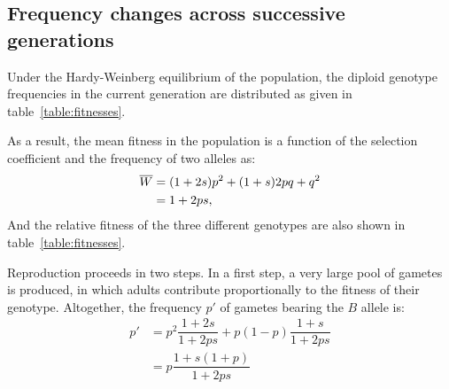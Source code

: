 \subsection{Frequency changes across successive generations}

Under the Hardy-Weinberg equilibrium of the population, the diploid genotype frequencies in the current generation are distributed as given in table~\ref{table:fitnesses}.

As a result, the mean fitness in the population is a function of the selection coefficient and the frequency of two alleles as:
\begin{align}
    \overline{W} &= (1+2s)p^2 + (1+s)2pq + q^2 \\
    &= 1 + 2ps,
\end{align}
And the relative fitness of the three different genotypes are also shown in table~\ref{table:fitnesses}.

\begin{table}[H]
    \centering
    \noindent{}
    \caption[Fitnesses of the different genotypes]{Fitnesses of the different genotypes}\label{table:fitnesses}
\end{table}

Reproduction proceeds in two steps.
In a first step, a very large pool of gametes is produced, in which adults contribute proportionally to the fitness of their genotype.
Altogether, the frequency $p'$ of gametes bearing the $B$ allele is:
\begin{align}
    p' & = p^2 \dfrac{1+2s}{1+2ps} + p (1-p)\dfrac{1+s}{1+2ps}\\
    & = p\dfrac{1+s(1+p)}{1 + 2ps}
\end{align}

